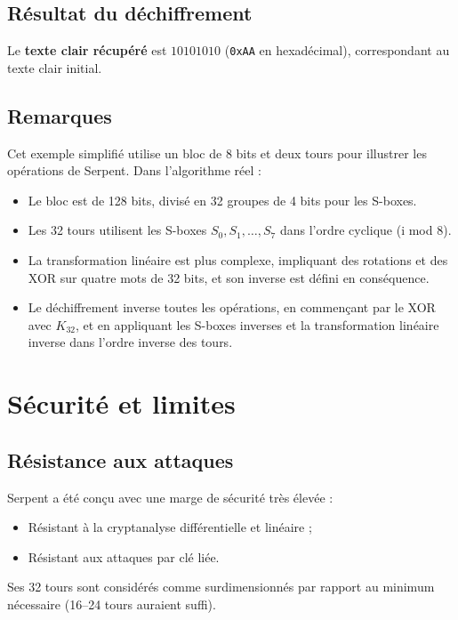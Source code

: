 \documentclass[12pt,a4paper]{report}
\begin{document}
\subsection{Résultat du déchiffrement}
Le \textbf{texte clair récupéré} est \( 10101010 \) (\texttt{0xAA} en hexadécimal), correspondant au texte clair initial.

\subsection{Remarques}
Cet exemple simplifié utilise un bloc de 8 bits et deux tours pour illustrer les opérations de Serpent. Dans l'algorithme réel :
\begin{itemize}
    \item Le bloc est de 128 bits, divisé en 32 groupes de 4 bits pour les S-boxes.
    \item Les 32 tours utilisent les S-boxes \( S_0, S_1, \dots, S_7 \) dans l'ordre cyclique (i mod 8).
    \item La transformation linéaire est plus complexe, impliquant des rotations et des XOR sur quatre mots de 32 bits, et son inverse est défini en conséquence.
    \item Le déchiffrement inverse toutes les opérations, en commençant par le XOR avec \( K_{32} \), et en appliquant les S-boxes inverses et la transformation linéaire inverse dans l'ordre inverse des tours.
\end{itemize}


\section*{Sécurité et limites}

\setcounter{subsection}{0}

\subsection{Résistance aux attaques}
Serpent a été conçu avec une marge de sécurité très élevée :
\begin{itemize}
    \item Résistant à la cryptanalyse différentielle et linéaire ;
    \item Résistant aux attaques par clé liée.
\end{itemize}
Ses 32 tours sont considérés comme surdimensionnés par rapport au minimum nécessaire (16–24 tours auraient suffi).
\end{document}
